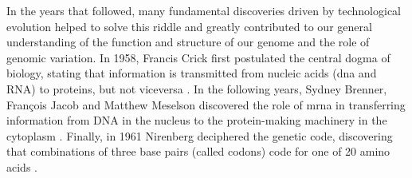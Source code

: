 In the years that followed, many fundamental discoveries driven by technological evolution helped to solve this riddle and greatly contributed to our general understanding of the function and structure of our genome and the role of genomic variation.
In 1958, Francis Crick first postulated the central dogma of biology, stating that information is transmitted from nucleic acids (\gls{dna} and RNA) to proteins, but not viceversa \cite{crick1958protein}.
In the following years, Sydney Brenner, François Jacob and Matthew Meselson discovered the role of \gls{mrna} in transferring information from DNA in the nucleus to the protein-making machinery in the cytoplasm \cite{brenner1961unstable}.
Finally, in 1961 Nirenberg deciphered the genetic code, discovering that combinations of three base pairs (called codons) code for one of 20 amino acids
\cite{nirenberg1961dependence, crick1961general, matthaei1962characteristics, yanofsky2007establishing}.
